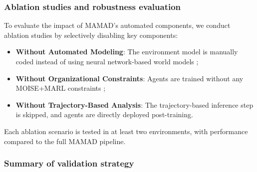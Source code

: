 \documentclass[pdflatex,sn-mathphys-num]{sn-jnl}%
\theoremstyle{thmstyleone}%
\theoremstyle{thmstyletwo}%
\theoremstyle{thmstylethree}%
\begin{document}
\subsubsection{Ablation studies and robustness evaluation}
To evaluate the impact of MAMAD's automated components, we conduct ablation studies by selectively disabling key components:
\begin{itemize}
    \item \textbf{Without Automated Modeling}: The environment model is manually coded instead of using neural network-based world models ;
    \item \textbf{Without Organizational Constraints}: Agents are trained without any MOISE+MARL constraints ;
    \item \textbf{Without Trajectory-Based Analysis}: The trajectory-based inference step is skipped, and agents are directly deployed post-training.
\end{itemize}

Each ablation scenario is tested in at least two environments, with performance compared to the full MAMAD pipeline.


\subsubsection{Summary of validation strategy}
\end{document}

